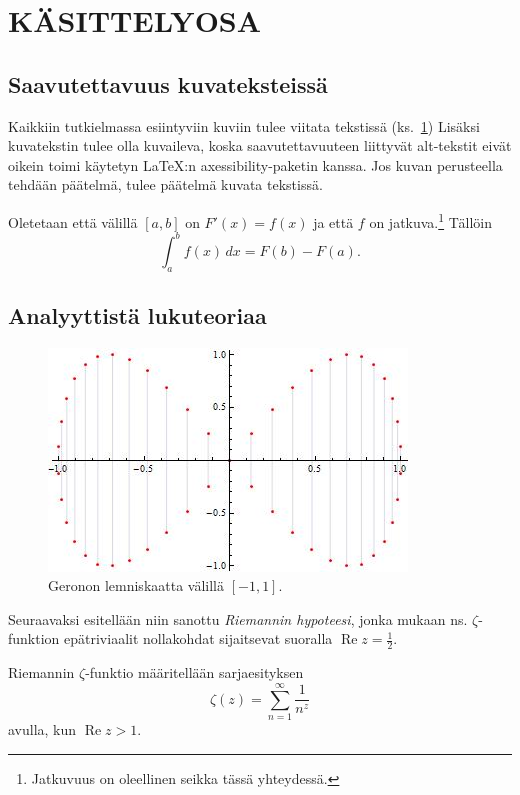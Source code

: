 \section{KÄSITTELYOSA}

\subsection{Saavutettavuus kuvateksteissä}

Kaikkiin tutkielmassa esiintyviin kuviin tulee viitata tekstissä (ks.~\ref{kuvatus1}) Lisäksi kuvatekstin tulee olla kuvaileva, koska saavutettavuuteen liittyvät alt-tekstit eivät oikein toimi käytetyn \LaTeX :n axessibility-paketin kanssa. Jos kuvan perusteella tehdään päätelmä, tulee päätelmä kuvata tekstissä. 
\begin{theorem} Oletetaan että välillä $[a,b]$ on $F'(x)=f(x)$ ja että $f$ on jatkuva.\footnote{Jatkuvuus on oleellinen seikka tässä yhteydessä.} Tällöin
\[
\int_a^bf(x)\,dx=F(b)-F(a).
\]
\end{theorem}

\subsection{Analyyttistä lukuteoriaa}

\begin{figure}[ht]
\begin{center}
\includegraphics[width=.45\textwidth]{siivet.jpg}
\end{center}
\label{kuvatus1}
\caption{Geronon lemniskaatta välillä $[-1,1]$.}
\end{figure}

Seuraavaksi esitellään niin sanottu {\em Riemannin hypoteesi}, jonka mukaan ns. $\zeta$-funktion epätriviaalit nollakohdat sijaitsevat suoralla $\operatorname{Re}z=\frac12$.
\begin{definition} Riemannin $\zeta$-funktio määritellään sarjaesityksen \cite{Riemann}
\[
\zeta(z)=\sum_{n=1}^{\infty}\frac{1}{n^z}
\]
avulla, kun $\operatorname{Re}z>1$.
\end{definition}

